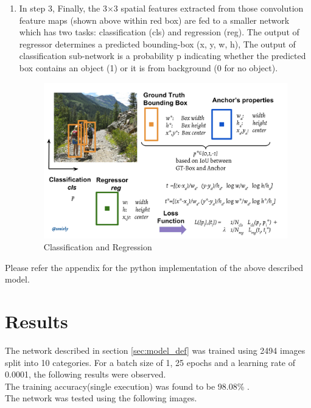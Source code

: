 \documentclass[12pt]{article}
\begin{document}
\begin{enumerate}
	\item In step 3, Finally, the 3×3 spatial features extracted from those convolution feature maps (shown above within red box) are fed to a smaller network which has two tasks: classification (cls) and regression (reg). The output of regressor determines a predicted bounding-box (x, y, w, h), The output of classification sub-network is a probability p indicating whether the predicted box contains an object (1) or it is from background (0 for no object).
\begin{figure}[H]
\centering
  \includegraphics[width=0.5\linewidth]{./Images/RPN3.png}
  \caption{Classification and Regression}
  \label{fig:RPN3}
\end{figure}
\end{enumerate} 






Please refer the appendix for the python implementation of the above described model. 
\newpage

\section{Results}
The network described in section \ref{sec:model_def} was trained using 2494 images split into 10 categories. For a batch size of 1, 25 epochs and a learning rate of 0.0001, the following results were observed. \\

\noindent
The training accuracy(single execution) was found to be 98.08\% . \\

\noindent
The network was tested using the following images. \\
\end{document}
